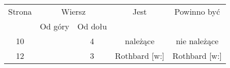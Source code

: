 \documentclass[a4paper,11pt]{article}
\numberwithin{equation}{section}
\begin{document}
\begin{center}

  \begin{tabular}{|c|c|c|c|c|}
    \hline
    Strona & \multicolumn{2}{c|}{Wiersz} & Jest
    & Powinno być \\ \cline{2-3}
    & Od góry & Od dołu & & \\
    \hline
    10  & &  4 & należące & nie należące \\
    12  & &  3 & Rothbard [w:] & Rothbard [w:] \\
    \hline
  \end{tabular}






\end{center}
\end{document}
